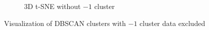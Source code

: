 \begin{figure}[H]
\begin{subfigure}[b]{0.45\textwidth}
        \caption{3D t-SNE without $-1$ cluster}\label{fig:DBSCAN_tsne_without}
    \end{subfigure}
    \caption{Visualization of DBSCAN clusters with $-1$ cluster data excluded}\label{fig:without_outliers}
    \hspace*{\fill}
\end{figure}
